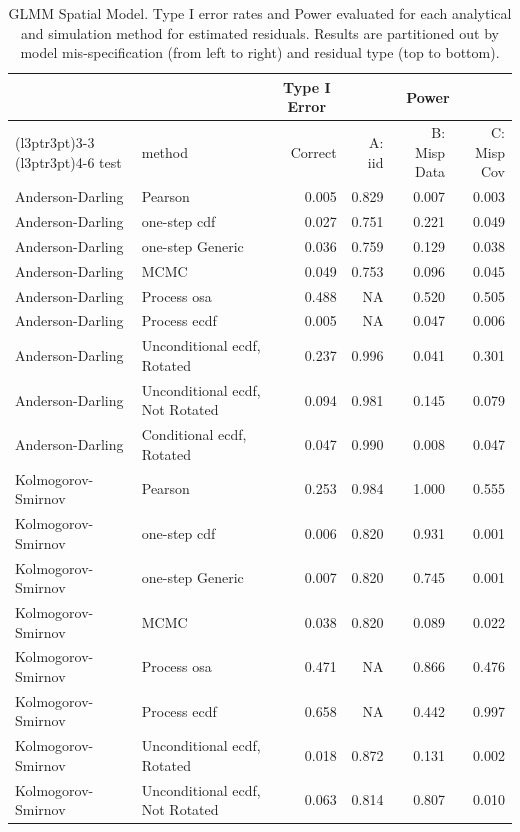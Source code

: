 \documentclass[
]{article}
\begin{document}
\begin{table}[H]
\centering
\caption{\label{tab:spatial-results-glmm-est}GLMM Spatial Model. Type I error rates and Power evaluated for each analytical and simulation method for estimated residuals. Results are partitioned out by model mis-specification (from left to right) and residual type (top to bottom).}
\centering
\begin{tabular}[t]{llrrrr}
\toprule
\multicolumn{1}{c}{ } & \multicolumn{1}{c}{ } & \multicolumn{1}{c}{Type I Error} & \multicolumn{3}{c}{Power} \\
\cmidrule(l{3pt}r{3pt}){3-3} \cmidrule(l{3pt}r{3pt}){4-6}
test & method & Correct & A: iid & B: Misp Data & C: Misp Cov\\
\midrule
Anderson-Darling & Pearson & 0.005 & 0.829 & 0.007 & 0.003\\
Anderson-Darling & one-step cdf & 0.027 & 0.751 & 0.221 & 0.049\\
Anderson-Darling & one-step Generic & 0.036 & 0.759 & 0.129 & 0.038\\
Anderson-Darling & MCMC & 0.049 & 0.753 & 0.096 & 0.045\\
Anderson-Darling & Process osa & 0.488 & NA & 0.520 & 0.505\\
\addlinespace
Anderson-Darling & Process ecdf & 0.005 & NA & 0.047 & 0.006\\
Anderson-Darling & Unconditional ecdf, Rotated & 0.237 & 0.996 & 0.041 & 0.301\\
Anderson-Darling & Unconditional ecdf, Not Rotated & 0.094 & 0.981 & 0.145 & 0.079\\
Anderson-Darling & Conditional ecdf, Rotated & 0.047 & 0.990 & 0.008 & 0.047\\
Kolmogorov- Smirnov & Pearson & 0.253 & 0.984 & 1.000 & 0.555\\
\addlinespace
Kolmogorov- Smirnov & one-step cdf & 0.006 & 0.820 & 0.931 & 0.001\\
Kolmogorov- Smirnov & one-step Generic & 0.007 & 0.820 & 0.745 & 0.001\\
Kolmogorov- Smirnov & MCMC & 0.038 & 0.820 & 0.089 & 0.022\\
Kolmogorov- Smirnov & Process osa & 0.471 & NA & 0.866 & 0.476\\
Kolmogorov- Smirnov & Process ecdf & 0.658 & NA & 0.442 & 0.997\\
\addlinespace
Kolmogorov- Smirnov & Unconditional ecdf, Rotated & 0.018 & 0.872 & 0.131 & 0.002\\
Kolmogorov- Smirnov & Unconditional ecdf, Not Rotated & 0.063 & 0.814 & 0.807 & 0.010\\

\end{tabular}
\end{table}
\end{document}
